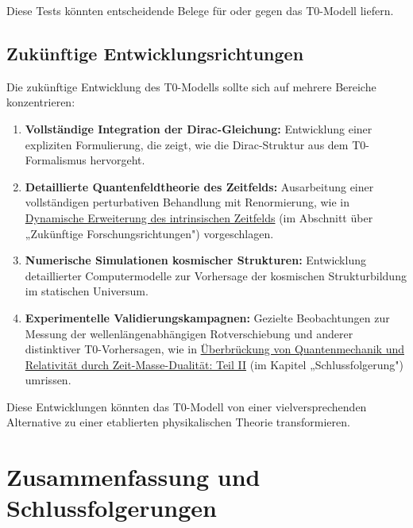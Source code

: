 \documentclass[12pt,a4paper]{article}
\begin{document}
	Diese Tests könnten entscheidende Belege für oder gegen das T0-Modell liefern.
	
	\subsection{Zukünftige Entwicklungsrichtungen}
	\label{subsec:future_directions}
	
	Die zukünftige Entwicklung des T0-Modells sollte sich auf mehrere Bereiche konzentrieren:
	
	\begin{enumerate}
		\item \textbf{Vollständige Integration der Dirac-Gleichung:} Entwicklung einer expliziten Formulierung, die zeigt, wie die Dirac-Struktur aus dem T0-Formalismus hervorgeht.
		
		\item \textbf{Detaillierte Quantenfeldtheorie des Zeitfelds:} Ausarbeitung einer vollständigen perturbativen Behandlung mit Renormierung, wie in \href{https://github.com/jpascher/T0-Time-Mass-Duality/tree/main/2/pdf/English/DynamicTF-SchrodingerExtensions_En.pdf}{Dynamische Erweiterung des intrinsischen Zeitfelds} (im Abschnitt über „Zukünftige Forschungsrichtungen") vorgeschlagen.
		
		\item \textbf{Numerische Simulationen kosmischer Strukturen:} Entwicklung detaillierter Computermodelle zur Vorhersage der kosmischen Strukturbildung im statischen Universum.
		
		\item \textbf{Experimentelle Validierungskampagnen:} Gezielte Beobachtungen zur Messung der wellenlängenabhängigen Rotverschiebung und anderer distinktiver T0-Vorhersagen, wie in \href{https://github.com/jpascher/T0-Time-Mass-Duality/tree/main/2/pdf/English/QMRelTimeMassPart2En.pdf}{Überbrückung von Quantenmechanik und Relativität durch Zeit-Masse-Dualität: Teil II} (im Kapitel „Schlussfolgerung") umrissen.
	\end{enumerate}
	
	Diese Entwicklungen könnten das T0-Modell von einer vielversprechenden Alternative zu einer etablierten physikalischen Theorie transformieren.
	
	\section{Zusammenfassung und Schlussfolgerungen}
	\label{sec:conclusion}
	
\end{document}
